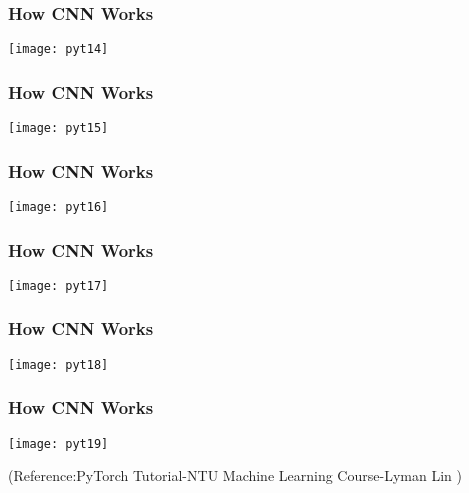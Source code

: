 \begin{frame}[fragile] \frametitle{How CNN Works}
\begin{center}
\texttt{[image: pyt14]}
\end{center}

\end{frame}

\begin{frame}[fragile] \frametitle{How CNN Works}
\begin{center}
\texttt{[image: pyt15]}
\end{center}

\end{frame}

\begin{frame}[fragile] \frametitle{How CNN Works}
\begin{center}
\texttt{[image: pyt16]}
\end{center}

\end{frame}

\begin{frame}[fragile] \frametitle{How CNN Works}
\begin{center}
\texttt{[image: pyt17]}
\end{center}

\end{frame}

\begin{frame}[fragile] \frametitle{How CNN Works}
\begin{center}
\texttt{[image: pyt18]}
\end{center}

\end{frame}

\begin{frame}[fragile] \frametitle{How CNN Works}
\begin{center}
\texttt{[image: pyt19]}
\end{center}
\tiny{(Reference:PyTorch Tutorial-NTU Machine Learning Course-Lyman Lin )}
\end{frame}
